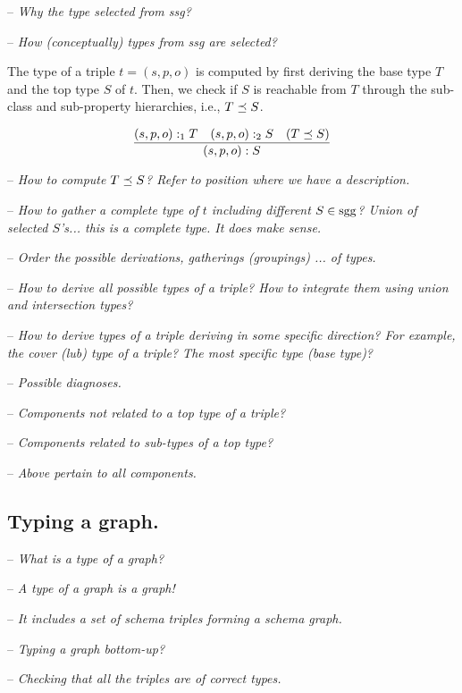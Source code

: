 \documentclass[runningheads]{llncs}
\newcommand{\nl}{\hfill\break}
\newcommand{\notes}[1]{\noindent\begin{small}-- \emph{#1}\\\end{small}}
\begin{document}
\notes{Why the type selected from ssg? }
\notes{How (conceptually) types from ssg are selected?}

The type of a triple $t=(s,p,o)$ is computed by first deriving the
base type $T$ and the top type $S$ of $t$. Then, we check if $S$ is
reachable from $T$ through the sub-class and sub-property hierarchies,
i.e., $T\preceq\/S$.

\begin{equation}
\dfrac{(s,p,o):_1T\quad (s,p,o):_2S\quad (T\preceq\/S)}
      {(s,p,o):S}
\end{equation}

\notes{How to compute $T\preceq\/S$? Refer to position where we have a description.}
\notes{How to gather a complete type of $t$ including different
$S\in\/\text{sgg}$? Union of selected $S$'s... this is a
\emph{complete} type. It does make sense.}

%
%

\noindent
\notes{Order the possible derivations, gatherings (groupings) ... of types.}
\notes{How to derive all possible types of a triple? How to integrate them using union and intersection types?}
\notes{How to derive types of a triple deriving in some specific direction? For example, the cover (lub) type of a triple? The most specific type (base type)?}

\noindent
\notes{Possible diagnoses.}
\notes{Components not related to a top type of a triple?}
\notes{Components related to sub-types of a top type?}
\notes{Above pertain to all components.}


\subsection{Typing a graph.}\nl

\notes{What is a type of a graph?}
\notes{A type of a graph is a graph!}
\notes{It includes a set of schema triples forming a schema graph.}

\notes{Typing a graph bottom-up?}
\notes{Checking that all the triples are of correct types.}
\end{document}
